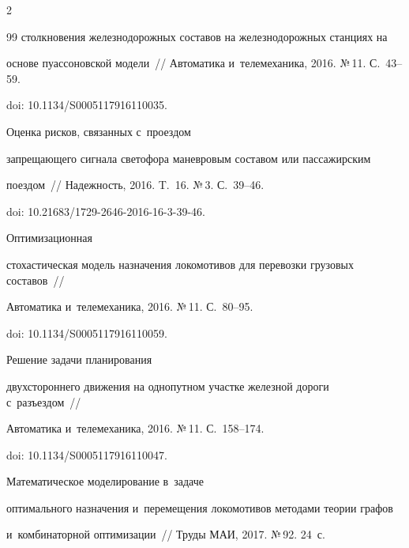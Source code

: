 \begin{multicols}{2}
{{\begin{thebibliography}{99}
столкновения железнодорожных составов на железнодорожных станциях на 


основе пуассоновской модели~// Автоматика и~телемеханика, 2016. №\,11. С.~43--59. 


doi: 10.1134/S0005117916110035.







 Оценка рисков, связанных с~проездом 


запрещающего сигнала светофора маневровым составом или пассажирским 


поездом~// Надежность, 2016. T.~16. №\,3. С.~39--46. 


doi: 10.21683/1729-2646-2016-16-3-39-46.







 Оптимизационная 


стохастическая модель назначения локомотивов для перевозки грузовых составов~// 


Автоматика и~телемеханика, 2016. №\,11. С.~80--95. 


doi: 10.1134/S0005117916110059.







 Решение задачи планирования 


двухстороннего движения на однопутном участке железной дороги с~разъездом~// 


Автоматика и~телемеханика, 2016. №\,11. С.~158--174. 


doi: 10.1134/S0005117916110047.







 Математическое моделирование в~задаче 


оптимального назначения и~перемещения локомотивов методами теории графов 


и~комбинаторной оптимизации~// Труды МАИ, 2017. №\,92. 24~с.






\end{thebibliography}}}
\end{multicols}
